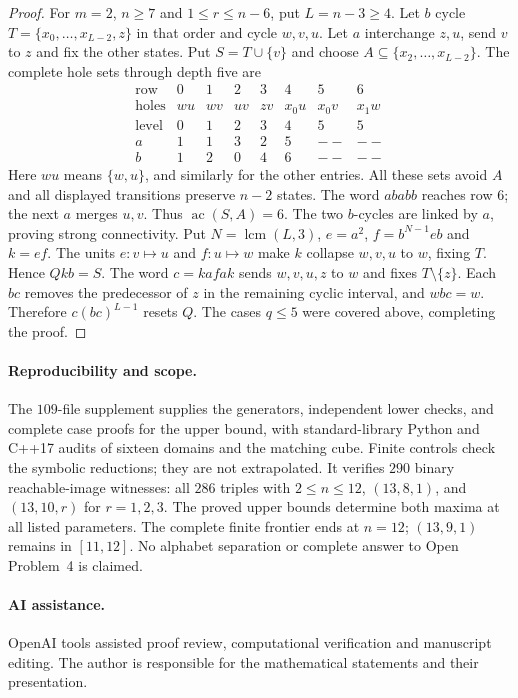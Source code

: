 \documentclass[10pt]{article}
\newcommand{\ac}{\operatorname{ac}}
\begin{document}
\begin{proof}
For $m=2$, $n\ge7$ and $1\le r\le n-6$, put $L=n-3\ge4$.
Let $b$ cycle $T=\{x_0,\ldots,x_{L-2},z\}$ in that order and cycle $w,v,u$.
Let $a$ interchange $z,u$, send $v$ to $z$ and fix the other states.
Put $S=T\cup\{v\}$ and choose $A\subseteq\{x_2,\ldots,x_{L-2}\}$.
The complete hole sets through depth five are
\[
\begin{array}{c|ccccccc}
\text{row}&0&1&2&3&4&5&6\\\hline
\text{holes}&wu&wv&uv&zv&x_0u&x_0v&x_1w\\
\text{level}&0&1&2&3&4&5&5\\
a&1&1&3&2&5&--&--\\
b&1&2&0&4&6&--&--
\end{array}
\]
Here $wu$ means $\{w,u\}$, and similarly for the other entries.
All these sets avoid $A$ and all displayed transitions preserve $n-2$ states.
The word $ababb$ reaches row 6; the next $a$ merges $u,v$.
Thus $\ac(S,A)=6$.
The two $b$-cycles are linked by $a$, proving strong connectivity.
Put $N=\operatorname{lcm}(L,3)$, $e=a^2$, $f=b^{N-1}eb$ and $k=ef$.
The units $e:v\mapsto u$ and $f:u\mapsto w$ make $k$ collapse $w,v,u$ to $w$,
fixing $T$. Hence $Qkb=S$.
The word $c=kafak$ sends $w,v,u,z$ to $w$ and fixes $T\setminus\{z\}$.
Each $bc$ removes the predecessor of $z$ in the remaining cyclic interval,
and $wbc=w$. Therefore $c(bc)^{L-1}$ resets $Q$.
The cases $q\le5$ were covered above, completing the proof.
\end{proof}

\paragraph{Reproducibility and scope.}
The $109$-file supplement supplies the generators, independent lower checks,
and complete case proofs for the upper bound, with standard-library Python
and C++17 audits of sixteen domains and the matching cube.
Finite controls check the symbolic reductions; they are not extrapolated.
It verifies $290$ binary reachable-image witnesses: all $286$ triples
with $2\le n\le12$, $(13,8,1)$, and $(13,10,r)$ for $r=1,2,3$.
The proved upper bounds determine both maxima at all listed parameters.
The complete finite frontier ends at $n=12$; $(13,9,1)$ remains in $[11,12]$.
No alphabet separation or complete answer to Open Problem~4 is claimed.

\paragraph{AI assistance.}
OpenAI tools assisted proof review, computational verification and manuscript editing. The author is responsible for the mathematical statements and their presentation.
\end{document}

